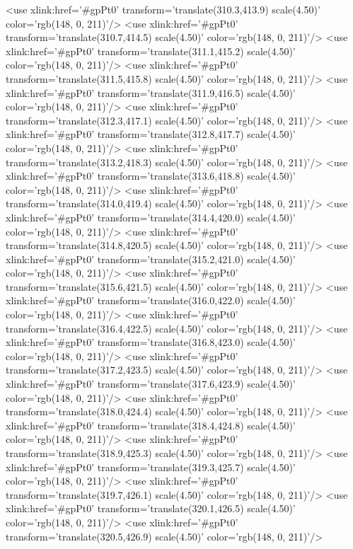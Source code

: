 	<use xlink:href='#gpPt0' transform='translate(310.3,413.9) scale(4.50)' color='rgb(148,   0, 211)'/>
	<use xlink:href='#gpPt0' transform='translate(310.7,414.5) scale(4.50)' color='rgb(148,   0, 211)'/>
	<use xlink:href='#gpPt0' transform='translate(311.1,415.2) scale(4.50)' color='rgb(148,   0, 211)'/>
	<use xlink:href='#gpPt0' transform='translate(311.5,415.8) scale(4.50)' color='rgb(148,   0, 211)'/>
	<use xlink:href='#gpPt0' transform='translate(311.9,416.5) scale(4.50)' color='rgb(148,   0, 211)'/>
	<use xlink:href='#gpPt0' transform='translate(312.3,417.1) scale(4.50)' color='rgb(148,   0, 211)'/>
	<use xlink:href='#gpPt0' transform='translate(312.8,417.7) scale(4.50)' color='rgb(148,   0, 211)'/>
	<use xlink:href='#gpPt0' transform='translate(313.2,418.3) scale(4.50)' color='rgb(148,   0, 211)'/>
	<use xlink:href='#gpPt0' transform='translate(313.6,418.8) scale(4.50)' color='rgb(148,   0, 211)'/>
	<use xlink:href='#gpPt0' transform='translate(314.0,419.4) scale(4.50)' color='rgb(148,   0, 211)'/>
	<use xlink:href='#gpPt0' transform='translate(314.4,420.0) scale(4.50)' color='rgb(148,   0, 211)'/>
	<use xlink:href='#gpPt0' transform='translate(314.8,420.5) scale(4.50)' color='rgb(148,   0, 211)'/>
	<use xlink:href='#gpPt0' transform='translate(315.2,421.0) scale(4.50)' color='rgb(148,   0, 211)'/>
	<use xlink:href='#gpPt0' transform='translate(315.6,421.5) scale(4.50)' color='rgb(148,   0, 211)'/>
	<use xlink:href='#gpPt0' transform='translate(316.0,422.0) scale(4.50)' color='rgb(148,   0, 211)'/>
	<use xlink:href='#gpPt0' transform='translate(316.4,422.5) scale(4.50)' color='rgb(148,   0, 211)'/>
	<use xlink:href='#gpPt0' transform='translate(316.8,423.0) scale(4.50)' color='rgb(148,   0, 211)'/>
	<use xlink:href='#gpPt0' transform='translate(317.2,423.5) scale(4.50)' color='rgb(148,   0, 211)'/>
	<use xlink:href='#gpPt0' transform='translate(317.6,423.9) scale(4.50)' color='rgb(148,   0, 211)'/>
	<use xlink:href='#gpPt0' transform='translate(318.0,424.4) scale(4.50)' color='rgb(148,   0, 211)'/>
	<use xlink:href='#gpPt0' transform='translate(318.4,424.8) scale(4.50)' color='rgb(148,   0, 211)'/>
	<use xlink:href='#gpPt0' transform='translate(318.9,425.3) scale(4.50)' color='rgb(148,   0, 211)'/>
	<use xlink:href='#gpPt0' transform='translate(319.3,425.7) scale(4.50)' color='rgb(148,   0, 211)'/>
	<use xlink:href='#gpPt0' transform='translate(319.7,426.1) scale(4.50)' color='rgb(148,   0, 211)'/>
	<use xlink:href='#gpPt0' transform='translate(320.1,426.5) scale(4.50)' color='rgb(148,   0, 211)'/>
	<use xlink:href='#gpPt0' transform='translate(320.5,426.9) scale(4.50)' color='rgb(148,   0, 211)'/>
